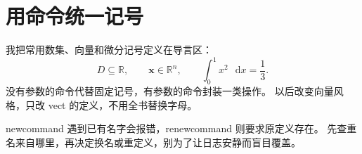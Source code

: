 \documentclass[UTF8,11pt,a4paper,oneside,openany,linespread=1]{ctexbook}
\newcommand{\R}{\mathbb{R}}
\newcommand{\vect}[1]{\bm{#1}}
\newcommand{\dd}{\mathop{}\!\mathrm{d}}
\begin{document}
\section{用命令统一记号}
我把常用数集、向量和微分记号定义在导言区：
\[
  D\subseteq\R,\qquad\vect{x}\in\R^n,\qquad
  \int_0^1x^2\,\dd x=\frac13.
\]
没有参数的命令代替固定记号，有参数的命令封装一类操作。
以后改变向量风格，只改 vect 的定义，不用全书替换字母。

newcommand 遇到已有名字会报错，renewcommand 则要求原定义存在。
先查重名来自哪里，再决定换名或重定义，别为了让日志安静而盲目覆盖。
\end{document}
